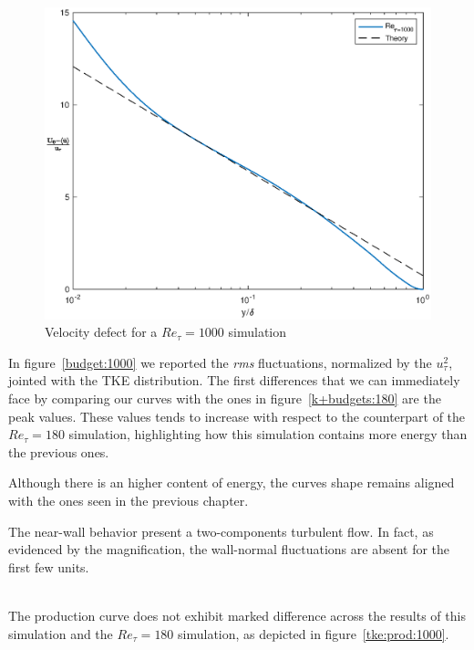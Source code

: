 \begin{figure}
\begin{center}
\includegraphics[scale=0.55]{grafici/velocity_defect_1000.eps}
\caption{Velocity defect for a $Re_{\tau}=1000$ simulation}
\label{velocity:defect:1000}
\end{center} 
\end{figure}

In figure~\ref{budget:1000} we reported the \emph{rms} fluctuations, normalized by the $u_{\tau}^{2}$, jointed with the TKE distribution. The first differences that we can immediately face by comparing our curves with the ones in figure~\ref{k+budgets:180} are the peak values. These values tends to increase with respect to the counterpart of the $Re_{\tau}=180$ simulation, highlighting how this simulation contains more energy than the previous ones.\par
Although there is an higher content of energy, the curves shape remains aligned with the ones seen in the previous chapter.\par
The near-wall behavior present a two-components turbulent flow. In fact, as evidenced by the magnification, the wall-normal fluctuations are absent for the first few units.
\\~\par

The production curve does not exhibit marked difference across the results of this simulation and the $Re_{\tau}=180$ simulation, as depicted in figure~\ref{tke:prod:1000}.\\~\par

